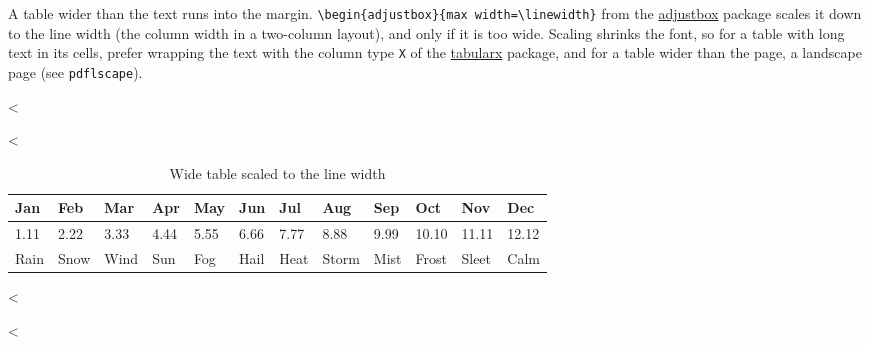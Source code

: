 A table wider than the text runs into the margin.
\verb|\begin{adjustbox}{max width=\linewidth}| from the \href{https://ctan.org/pkg/adjustbox}{adjustbox} package scales it down to the line width (the column width in a two-column layout), and only if it is too wide.
Scaling shrinks the font, so for a table with long text in its cells, prefer wrapping the text with the column type \verb|X| of the \href{https://ctan.org/pkg/tabularx}{tabularx} package, and for a table wider than the page, a landscape page (see \texttt{pdflscape}).

<%
\begin{table}
  \caption{Wide table scaled to the line width}
  \label{tab:wide}
  \centering
<%
  \begin{adjustbox}{max width=\linewidth}
    \begin{tabular}{llllllllllll}
      \toprule
      Jan  & Feb  & Mar  & Apr  & May  & Jun  & Jul  & Aug   & Sep  & Oct   & Nov   & Dec   \\
      \midrule
      1.11 & 2.22 & 3.33 & 4.44 & 5.55 & 6.66 & 7.77 & 8.88  & 9.99 & 10.10 & 11.11 & 12.12 \\
      Rain & Snow & Wind & Sun  & Fog  & Hail & Heat & Storm & Mist & Frost & Sleet & Calm  \\
      \bottomrule
    \end{tabular}
  \end{adjustbox}
\end{table}
<%

<%
